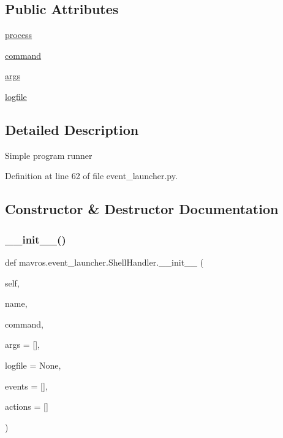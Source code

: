 \subsection*{Public Attributes}
\begin{DoxyCompactItemize}
\item 
\mbox{\hyperlink{classmavros_1_1event__launcher_1_1ShellHandler_a8f9556714b12b53ef0027ffe6b0afad2}{process}}
\item 
\mbox{\hyperlink{classmavros_1_1event__launcher_1_1ShellHandler_a0297802ce5086d8bdc70e72ef201446d}{command}}
\item 
\mbox{\hyperlink{classmavros_1_1event__launcher_1_1ShellHandler_a118590103db90fa1e414f3e592ae8bc7}{args}}
\item 
\mbox{\hyperlink{classmavros_1_1event__launcher_1_1ShellHandler_ae55a715a3e3afb61c6e9fca7350a39f5}{logfile}}
\end{DoxyCompactItemize}


\subsection{Detailed Description}
\begin{DoxyVerb}Simple program runner
\end{DoxyVerb}
 

Definition at line 62 of file event\+\_\+launcher.\+py.



\subsection{Constructor \& Destructor Documentation}
\mbox{\label{classmavros_1_1event__launcher_1_1ShellHandler_a521665715cbddd6e99c316bb8accebcf}} 
\subsubsection{\texorpdfstring{\_\_init\_\_()}{\_\_init\_\_()}}
{\footnotesize\ttfamily def mavros.\+event\+\_\+launcher.\+Shell\+Handler.\+\_\+\+\_\+init\+\_\+\+\_\+ (\begin{DoxyParamCaption}\item[{}]{self,  }\item[{}]{name,  }\item[{}]{command,  }\item[{}]{args = {\ttfamily \mbox{[}\mbox{]}},  }\item[{}]{logfile = {\ttfamily None},  }\item[{}]{events = {\ttfamily \mbox{[}\mbox{]}},  }\item[{}]{actions = {\ttfamily \mbox{[}\mbox{]}} }\end{DoxyParamCaption})}



